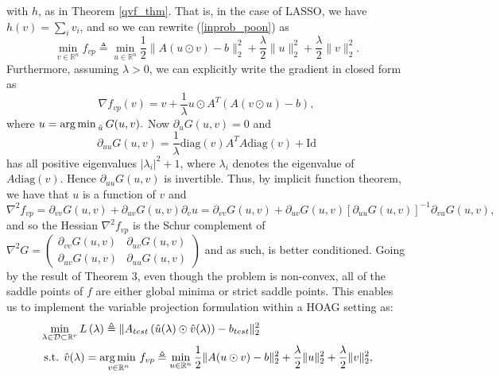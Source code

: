 \documentclass[11pt, twoside]{report}
\begin{document}
with $h$, as in Theorem \ref{qvf_thm}. That is, in the case of LASSO, we have $h(v) = \sum_i v_i$, and so we can rewrite (\ref{inprob_poon}) as
\begin{equation} \label{noncvx_varpro_lasso}
    \min_{v \in \mathbb{R}^n} f_{vp} \triangleq \min_{u \in \mathbb{R}^n}{\frac{1}{2}\|A(u \odot v)-b\|_2^2 + \frac{\lambda}{2} \|u\|^2_2 + \frac{\lambda}{2} \|v\|_2^2}.
\end{equation}
Furthermore, assuming $\lambda > 0$, we can explicitly write the gradient in closed form as
\begin{equation*}
    \nabla f_{vp}(v)=v +\frac{1}{\lambda} u \odot A^T\left( A(v \odot u) - b\right),
\end{equation*}
where $u = \operatorname*{arg\, min \,}_{\tilde{u}} G(u,v). $ Now $\partial_u G(u,v) = 0$ and
\[\partial_{uu} G(u,v) = \frac{1}{\lambda} \mathrm{diag}(v)A^TA\mathrm{diag}(v) + \mathrm{Id}\]
has all positive eigenvalues $|\lambda_i|^2 + 1$, where $\lambda_i$ denotes the eigenvalue of $A\mathrm{diag}(v)$. Hence $\partial_{uu} G(u,v)$ is invertible. Thus, by implicit function theorem, we have that $u$ is a function of $v$ and
\begin{equation}\label{eq: fvphess}
    \nabla^2 f_{vp} = \partial_{vv} G(u,v) + \partial_{uv}G(u,v) \partial_v u = \partial_{vv} G(u,v) + \partial_{uv}G(u,v) [\partial_{uu}G(u,v)]^{-1}\partial_{vu}G(u,v),
\end{equation}
and so the Hessian $\nabla^2 f_{vp}$ is the Schur complement of 
$\nabla^2 G = 
\begin{pmatrix} 
\partial_{vv} G(u,v) & \partial_{uv} G(u,v) \\
\partial_{uv} G(u,v) & \partial_{uu} G(u,v)
\end{pmatrix}$
and as such, is better conditioned. Going by the result of Theorem 3\cite{poon}, even though the problem is non-convex, all of the saddle points of $f$ are either global minima or strict saddle points. This enables us to implement the variable projection formulation within a HOAG setting as:
\begin{align} 
&\min _{\lambda \in \mathcal{D} \subset \mathbb{R}^r} L\left(\lambda \right) \triangleq \|A_{test} \left(\hat{u}(\lambda) \odot \hat{v}(\lambda) \right) - b_{test}\|_2^2 \label{outprob_vp_poon}\\
&\text { s.t. } \hat{v}(\lambda) = \operatorname*{arg\, min \,}_{v \in \mathbb{R}^n} f_{vp} \triangleq \min_{u \in \mathbb{R}^n}{\frac{1}{2}\|A(u \odot v)-b\|_2^2 + \frac{\lambda}{2} \|u\|^2_2 + \frac{\lambda}{2} \|v\|_2^2}, \label{inprob_vp_poon}
\end{align}
\end{document}
